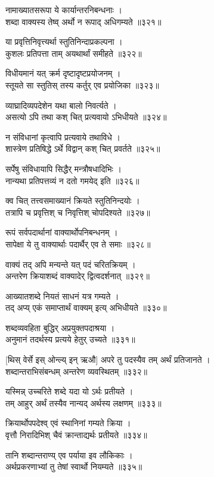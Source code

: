 नामाख्यातसरूपा ये कार्यान्तरनिबन्धनाः ।\\शब्दा वाक्यस्य तेष्व् अर्थो न रूपाद् अधिगम्यते ॥३२१॥

या प्रवृत्तिनिवृत्त्यर्था स्तुतिनिन्दाप्रकल्पना ।\\कुशलः प्रतिपत्ता ताम् अयथार्थां समीहते ॥३२२॥

विधीयमानं यत् क्रर्म दृष्टादृष्टप्रयोजनम् ।\\स्तूयते सा स्तुतिस् तस्य कर्तुर् एव प्रयोजिका ॥३२३॥

व्याघ्रादिव्यपदेशेन यथा बालो निवर्त्यते ।\\असत्यो ऽपि तथा कश् चित् प्रत्यवायो ऽभिधीयते ॥३२४॥

न संविधानां कृत्वापि प्रत्यवाये तथाविधे ।\\शास्त्रेण प्रतिषिद्धे ऽर्थे विद्वान् कश् चित् प्रवर्तते ॥३२५॥

सर्पेषु संविधायापि सिद्धैर् मन्त्रौषधादिभिः ।\\नान्यथा प्रतिपत्तव्यं न दतो गमयेद् इति ॥३२६॥

क्व चित् तत्त्वसमाख्यानं क्रियते स्तुतिनिन्दयोः ।\\तत्रापि च प्रवृत्तिश् च निवृत्तिश् चोपदिश्यते ॥३२७॥

रूपं सर्वपदार्थानां वाक्यार्थोपनिबन्धनम् ।\\सापेक्षा ये तु वाक्यार्थाः पदार्थैर् एव ते समाः ॥३२८॥

वाक्यं तद् अपि मन्यन्ते यत् पदं चरितक्रियम् ।\\अन्तरेण क्रियाशब्दं वाक्यादेर् द्वित्वदर्शनात् ॥३२९॥

आख्यातशब्दे नियतं साधनं यत्र गम्यते ।\\तद् अप्य् एकं समाप्तार्थं वाक्यम् इत्य् अभिधीयते ॥३३०॥

शब्दव्यवहिता बुद्धिर् अप्रयुक्तपदाश्रया ।\\अनुमानं तदर्थस्य प्रत्यये हेतुर् उच्यते ॥३३१॥

[थिस् वेर्से इस् ओन्ल्य् इन् ऋऔ] अपरे तु पदस्यैव तम् अर्थं प्रतिजानते ।\\शब्दान्तराभिसंबन्धम् अन्तरेण व्यवस्थितम् ॥३३२॥

यस्मिन्न् उच्चरिते शब्दे यदा यो ऽर्थः प्रतीयते ।\\तम् आहुर् अर्थं तस्यैव नान्यद् अर्थस्य लक्षणम् ॥३३३॥

क्रियार्थोपपदेश्व् एवं स्थानिनां गम्यते क्रिया ।\\वृत्तौ निरादिभिश् चैवं क्रान्ताद्यर्थः प्रतीयते ॥३३४॥

तानि शब्दान्तराण्य् एव पर्याया इव लौकिकाः ।\\अर्थप्रकरणाभ्यां तु तेषां स्वार्थो नियम्यते ॥३३५॥

